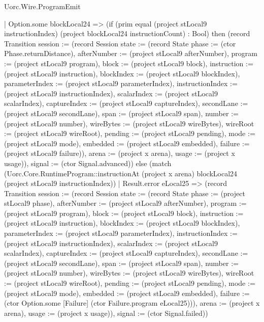 \begin{lexlean}{Uorc.Wire.ProgramEmit}
\begin{semanticmodule}
{          | Option.some blockLocal24 => (if (prim equal (project stLocal9 instructionIndex) (project blockLocal24 instructionCount) : Bool) then (record Transition {session := (record Session {state := (record State {phase := (ctor Phase.returnDistance), afterNumber := (project stLocal9 afterNumber), program := (project stLocal9 program), block := (project stLocal9 block), instruction := (project stLocal9 instruction), blockIndex := (project stLocal9 blockIndex), parameterIndex := (project stLocal9 parameterIndex), instructionIndex := (project stLocal9 instructionIndex), scalarIndex := (project stLocal9 scalarIndex), captureIndex := (project stLocal9 captureIndex), secondLane := (project stLocal9 secondLane), span := (project stLocal9 span), number := (project stLocal9 number), wireBytes := (project stLocal9 wireBytes), wireRoot := (project stLocal9 wireRoot), pending := (project stLocal9 pending), mode := (project stLocal9 mode), embedded := (project stLocal9 embedded), failure := (project stLocal9 failure)}), arena := (project x arena), usage := (project x usage)}), signal := (ctor Signal.advanced)}) else (match (Uorc.Core.RuntimeProgram::instructionAt (project x arena) blockLocal24 (project stLocal9 instructionIndex))
            | Result.error eLocal25 => (record Transition {session := (record Session {state := (record State {phase := (project stLocal9 phase), afterNumber := (project stLocal9 afterNumber), program := (project stLocal9 program), block := (project stLocal9 block), instruction := (project stLocal9 instruction), blockIndex := (project stLocal9 blockIndex), parameterIndex := (project stLocal9 parameterIndex), instructionIndex := (project stLocal9 instructionIndex), scalarIndex := (project stLocal9 scalarIndex), captureIndex := (project stLocal9 captureIndex), secondLane := (project stLocal9 secondLane), span := (project stLocal9 span), number := (project stLocal9 number), wireBytes := (project stLocal9 wireBytes), wireRoot := (project stLocal9 wireRoot), pending := (project stLocal9 pending), mode := (project stLocal9 mode), embedded := (project stLocal9 embedded), failure := (ctor Option.some [Failure] (ctor Failure.program eLocal25))}), arena := (project x arena), usage := (project x usage)}), signal := (ctor Signal.failed)})
}
\end{semanticmodule}
\end{lexlean}
